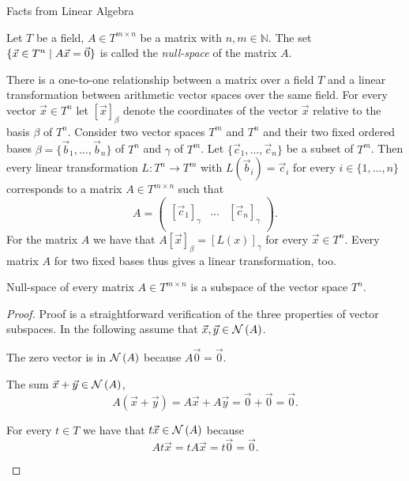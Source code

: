 \begin{chapter}{Facts from Linear Algebra}
\begin{definition}
Let $T$ be a field, $A \in T ^ {m \times n}$ be a matrix with $n, m \in \mathbb{N}$. The set $\{ \vec{x} \in T^{n} \mid A\vec{x} = \vec{0} \}$ is called the \emph{null-space} of the matrix $A$.
\end{definition}

There is a one-to-one relationship between a matrix over a field $T$ and a linear transformation between arithmetic vector spaces over the same field. For every vector $\vec{x} \in T^n$ let $[\vec{x}]_\beta$ denote the coordinates of the vector $\vec{x}$ relative to the basis $\beta$ of $T^n$.
Consider two vector spaces $T^{m}$ and $T^{n}$ and their two fixed ordered bases $\beta = \{\vec{b}_1, \dots, \vec{b}_n\}$ of $T^{n}$ and $\gamma$ of $T^m$. Let $\{\vec{c}_1, \dots, \vec{c}_n \}$ be a subset of $T^{m}$. Then every linear transformation $L: T^{n} \rightarrow T^{m}$ with $L(\vec{b}_i) = \vec{c}_i$ for every $i \in \{1, \dots, n \}$ corresponds to a matrix $A \in T ^ {m \times n}$ such that 
\[
A = \begin{pmatrix}
    &   &   \\
  [\vec{c}_1]_\gamma & \dots & [\vec{c}_n]_\gamma \\
    &   &  
 \end{pmatrix} \text{.}
\] For the matrix $A$ we have that $A[\vec{x}]_\beta = [L(x)]_\gamma$ for every $\vec{x} \in T^n$. Every matrix $A$ for two fixed bases thus gives a linear transformation, too.

\begin{remark}
\label{remark-null-space}
Null-space of every matrix $A \in T ^ {m \times n}$ is a subspace of the vector space $T^{n}$.
\end{remark}
\begin{proof}
Proof is a straightforward verification of the three properties of vector subspaces. In the following assume that $\vec{x}, \vec{y} \in \mathcal{N}\left({A}\right)$.

\begin{description}
\item The zero vector is in $\mathcal{N}\left({A}\right)$ because $A\vec{0} = \vec{0}$.
\item The sum $\vec{x} + \vec{y} \in \mathcal{N}\left({A}\right)$,
\[
	A(\vec{x} + \vec{y}) = A\vec{x} + A\vec{y} = \vec{0} + \vec{0} = \vec{0} \text{.}
\]

\item For every $t \in T$ we have that $t \vec{x} \in \mathcal{N}\left({A}\right)$ because
\[
	At\vec{x} = tA\vec{x} = t\vec{0} = \vec{0} \text{.}
\]
\end{description}
\end{proof}


\end{chapter}

